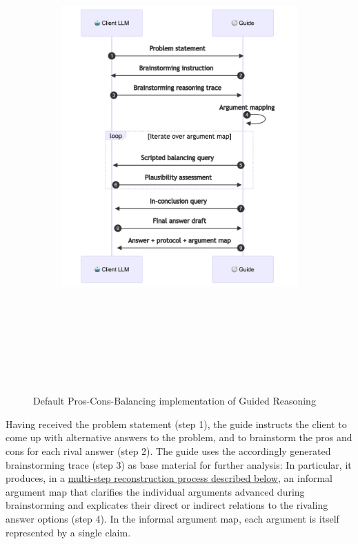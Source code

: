 \documentclass[
  letterpaper,
  DIV=11,
  numbers=noendperiod]{scrartcl}
\begin{document}
\begin{figure}

{\centering 

\begin{figure}[H]

{\centering \includegraphics[width=6in,height=7.1in]{intro_guided_reasoning_files/figure-latex/mermaid-figure-4.png}

}

\end{figure}

}

\caption{\label{fig-focus-gr}Default Pros-Cons-Balancing implementation
of Guided Reasoning}

\end{figure}

Having received the problem statement (step 1), the guide instructs the
client to come up with alternative answers to the problem, and to
brainstorm the pros and cons for each rival answer (step 2). The guide
uses the accordingly generated brainstorming trace (step 3) as base
material for further analysis: In particular, it produces, in a
\protect\hyperlink{informal-argument-mapping-workflow}{multi-step
reconstruction process described below}, an informal argument map that
clarifies the individual arguments advanced during brainstorming and
explicates their direct or indirect relations to the rivaling answer
options (step 4). In the informal argument map, each argument is itself
represented by a single claim.
\end{document}
